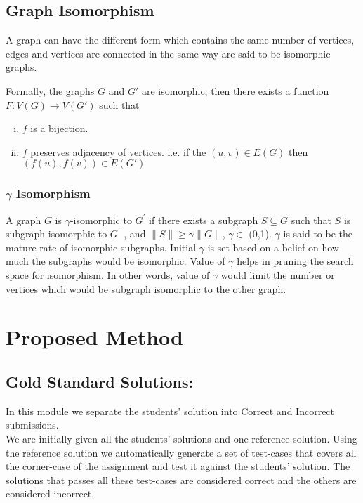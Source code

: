 \documentclass{article}
\begin{document}
\subsection*{Graph Isomorphism}
A graph can have the different form which contains the same number of vertices, edges and vertices are connected in the same way are said to be isomorphic graphs. 

Formally, the graphs $G$ and $G'$ are isomorphic, then there exists a function $F: V(G) \to V(G')$ such that
\begin{enumerate}[i.]
  \item $f$ is a bijection.
  \item $f$ preserves adjacency of vertices. i.e. if the $(u,v) \in E(G)$ then $(f(u),f(v)) \in E(G')$
\end{enumerate}

\subsubsection*{$\gamma$ Isomorphism}
A graph $G$ is $\gamma$-isomorphic to $G^\prime$ if there exists a subgraph $S \subseteq G$ such that $S$ is
subgraph isomorphic to $G^\prime$ , and $\|S\| \geq \gamma \|G\|$, $\gamma \in$ (0,1). $\gamma$ is said to be the mature rate of isomorphic subgraphs. Initial $\gamma$ is set based on a belief on how much the subgraphs would be isomorphic. Value of $\gamma$ helps in pruning the search space for isomorphism. In other words, value of $\gamma$ would limit the number or vertices which would be subgraph isomorphic to the other graph.\\

\section{Proposed Method}

\subsection{Gold Standard Solutions:}
    In this module we separate the students' solution into Correct and Incorrect submissions.\\
    We are initially given all the students' solutions and one reference solution. Using the reference solution we automatically generate a set of test-cases that covers all the corner-case of the assignment and test it against the students' solution.  The solutions that passes all these test-cases are considered correct and the others are considered incorrect.
    
\end{document}
